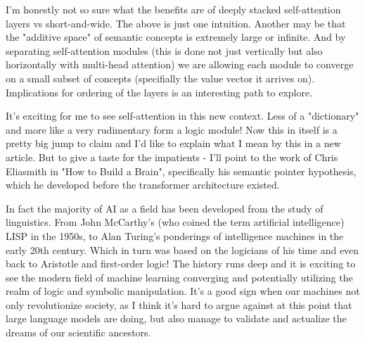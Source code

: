 I'm honestly not so sure what the benefits are of deeply stacked self-attention layers vs short-and-wide. The above is just one intuition. Another may be that the "additive space" of semantic concepts is extremely large or infinite. And by separating self-attention modules (this is done not just vertically but also horizontally with multi-head attention) we are allowing each module to converge on a small subset of concepts (specifially the value vector it arrives on). Implications for ordering of the layers is an interesting path to explore.

It's exciting for me to see self-attention in this new context. Less of a "dictionary" and more like a very rudimentary form a logic module! Now this in itself is a pretty big jump to claim and I'd like to explain what I mean by this in a new article. But to give a taste for the impatients - I'll point to the work of Chris Eliasmith in "How to Build a Brain", specifically his semantic pointer hypothesis, which he developed before the transformer architecture existed.

In fact the majority of AI as a field has been developed from the study of linguistics. From John McCarthy's (who coined the term artificial intelligence) LISP in the 1950s, to Alan Turing's ponderings of intelligence machines in the early 20th century. Which in turn was based on the logicians of his time and even back to Aristotle and first-order logic! The history runs deep and it is exciting to see the modern field of machine learning converging and potentially utilizing the realm of logic and symbolic manipulation. It's a good sign when our machines not only revolutionize society, as I think it's hard to argue against at this point that large language models are doing, but also manage to validate and actualize the dreams of our scientific ancestors.
